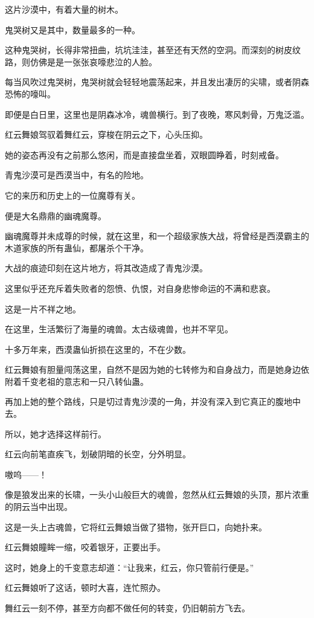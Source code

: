 \begin{this_body}
这片沙漠中，有着大量的树木。

鬼哭树又是其中，数量最多的一种。

这种鬼哭树，长得非常扭曲，坑坑洼洼，甚至还有天然的空洞。而深刻的树皮纹路，则仿佛是是一张张哀嚎悲泣的人脸。

每当风吹过鬼哭树，鬼哭树就会轻轻地震荡起来，并且发出凄厉的尖啸，或者阴森恐怖的嚎叫。

即便是白日里，这里也是阴森冰冷，魂兽横行。到了夜晚，寒风刺骨，万鬼泛滥。

红云舞娘驾驭着舞红云，穿梭在阴云之下，心头压抑。

她的姿态再没有之前那么悠闲，而是直接盘坐着，双眼圆睁着，时刻戒备。

青鬼沙漠可是西漠当中，有名的险地。

它的来历和历史上的一位魔尊有关。

便是大名鼎鼎的幽魂魔尊。

幽魂魔尊并未成尊的时候，就在这里，和一个超级家族大战，将曾经是西漠霸主的木道家族的所有蛊仙，都屠杀个干净。

大战的痕迹印刻在这片地方，将其改造成了青鬼沙漠。

这里似乎还充斥着失败者的怨愤、仇恨，对自身悲惨命运的不满和悲哀。

这是一片不祥之地。

在这里，生活繁衍了海量的魂兽。太古级魂兽，也并不罕见。

十多万年来，西漠蛊仙折损在这里的，不在少数。

红云舞娘有胆量闯荡这里，自然不是因为她的七转修为和自身战力，而是她身边依附着千变老祖的意志和一只八转仙蛊。

再加上她的整个路线，只是切过青鬼沙漠的一角，并没有深入到它真正的腹地中去。

所以，她才选择这样前行。

红云向前笔直疾飞，划破阴暗的长空，分外明显。

嗷呜——！

像是狼发出来的长啸，一头小山般巨大的魂兽，忽然从红云舞娘的头顶，那片浓重的阴云当中出现。

这是一头上古魂兽，它将红云舞娘当做了猎物，张开巨口，向她扑来。

红云舞娘瞳眸一缩，咬着银牙，正要出手。

这时，她身上的千变意志却道：“让我来，红云，你只管前行便是。”

红云舞娘听了这话，顿时大喜，连忙照办。

舞红云一刻不停，甚至方向都不做任何的转变，仍旧朝前方飞去。


\end{this_body}
